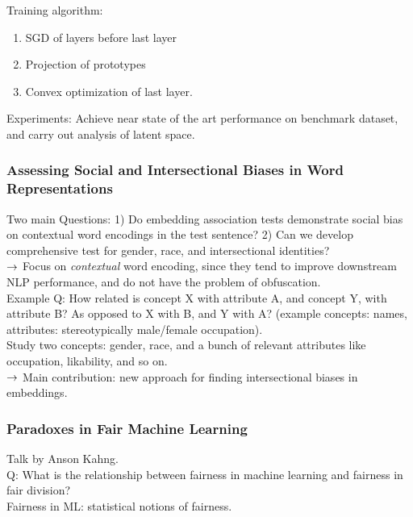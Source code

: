 Training algorithm:
\begin{enumerate}
    \item SGD of layers before last layer
    \item Projection of prototypes
    \item Convex optimization of last layer.
\end{enumerate}

Experiments: Achieve near state of the art performance on benchmark dataset, and carry out analysis of latent space.

\subsubsection{Assessing Social and Intersectional Biases in Word Representations \cite{tan2019assessing}}

Two main Questions: 1) Do embedding association tests demonstrate social bias on contextual word encodings in the test sentence? 2) Can we develop comprehensive test for gender, race, and intersectional identities? \\

$\rightarrow$ Focus on {\it contextual} word encoding, since they tend to improve downstream NLP performance, and do not have the problem of obfuscation. \\

Example Q: How related is concept X with attribute A, and concept Y, with attribute B? As opposed to X with B, and Y with A? (example concepts: names, attributes: stereotypically male/female occupation). \\

Study two concepts: gender, race, and a bunch of relevant attributes like occupation, likability, and so on. \\

$\rightarrow$ Main contribution: new approach for finding intersectional biases in embeddings.


\subsubsection{Paradoxes in Fair Machine Learning \cite{golz2019paradoxes}}

Talk by Anson Kahng. \\

Q: What is the relationship between fairness in machine learning and fairness in fair division? \\

Fairness in ML: statistical notions of fairness.

